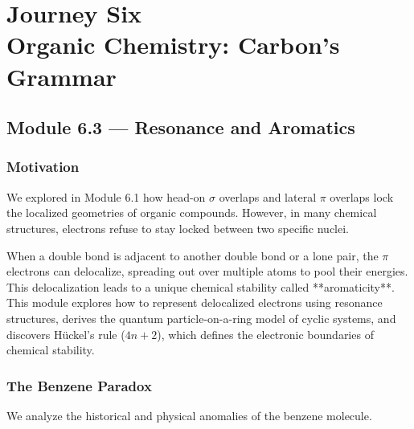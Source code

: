 \documentclass[12pt, a4paper]{book}
\begin{document}
\setcounter{chapter}{5}
\chapter[Journey 6 --- Organic Chemistry: Carbon's Grammar]
        {Journey Six\\[8pt]
         \textcolor{ModuleColor}{\large Organic Chemistry: Carbon's Grammar}}
\setcounter{section}{2}

\section{Module 6.3 --- Resonance and Aromatics}
\label{sec:mod6.3}

\subsection*{Motivation}

We explored in Module 6.1 how head-on $\sigma$ overlaps and lateral $\pi$ overlaps lock the localized geometries of organic compounds.
However, in many chemical structures, electrons refuse to stay locked between two specific nuclei.

When a double bond is adjacent to another double bond or a lone pair, the $\pi$ electrons can delocalize, spreading out over multiple atoms to pool their energies.
This delocalization leads to a unique chemical stability called **aromaticity**.
This module explores how to represent delocalized electrons using resonance structures, derives the quantum particle-on-a-ring model of cyclic systems, and discovers Hückel's rule ($4n+2$), which defines the electronic boundaries of chemical stability.

\subsection{The Benzene Paradox}

We analyze the historical and physical anomalies of the benzene molecule.
\end{document}
